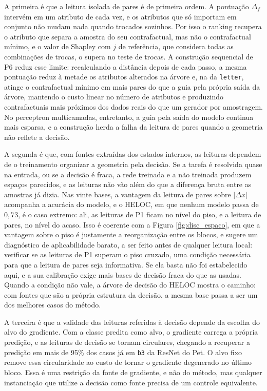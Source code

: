A primeira é que a leitura isolada de pares é de primeira ordem. A pontuação $\Delta_f$ intervém em um atributo de cada vez, e os atributos que só importam em conjunto não mudam nada quando trocados sozinhos. Por isso o ranking recupera o atributo que separa a amostra do seu contrafactual, mas não o contrafactual mínimo, e o valor de Shapley com $j$ de referência, que considera todas as combinações de trocas, o supera no teste de trocas. A construção sequencial de P6 reduz esse limite: recalculando a distância depois de cada passo, a mesma pontuação reduz à metade os atributos alterados na árvore e, na da \texttt{letter}, atinge o contrafactual mínimo em mais pares do que a guia pela própria saída da árvore, mantendo o custo linear no número de atributos e produzindo contrafactuais mais próximos dos dados reais do que um gerador por amostragem. No perceptron multicamadas, entretanto, a guia pela saída do modelo continua mais esparsa, e a construção herda a falha da leitura de pares quando a geometria não reflete a decisão.

A segunda é que, com fontes extraídas dos estados internos, as leituras dependem de o treinamento organizar a geometria pela decisão. Se a tarefa é resolvida quase na entrada, ou se a decisão é fraca, a rede treinada e a não treinada produzem espaços parecidos, e as leituras não vão além do que a diferença bruta entre as amostras já dizia. Nas vinte bases, a vantagem da leitura de pares sobre $|\Delta x|$ acompanha a acurácia do modelo, e o HELOC, em que nenhum modelo passa de $0{,}73$, é o caso extremo: ali, as leituras de P1 ficam no nível do piso, e a leitura de pares, no nível do acaso. Isso é coerente com a Figura \ref{fig:disc_espaco}, em que a vantagem sobre o piso é justamente a reorganização entre os blocos, e sugere um diagnóstico de aplicabilidade barato, a ser feito antes de qualquer leitura local: verificar se as leituras de P1 superam o piso cruzado, uma condição necessária para que a leitura de pares seja informativa. Se ela basta não foi estabelecido aqui, e a sua calibração exige mais bases de decisão fraca do que as usadas. Quando a condição não vale, a árvore de decisão do HELOC mostra o caminho: com fontes que são a própria estrutura da decisão, a mesma base passa a ser um dos melhores casos do método.

A terceira é que a validade das leituras referidas à decisão depende da escolha do alvo do gradiente. Com a classe predita como alvo, o gradiente carrega a própria predição, e as leituras de decisão se tornam circulares, chegando a recuperar a predição em mais de 95\% dos casos já em \texttt{b3} da ResNet do Pet. O alvo fixo remove essa circularidade ao custo de tornar o gradiente degenerado no último bloco. Essa é uma restrição da fonte de gradiente, e não do método, mas qualquer instanciação que utilize a decisão como fonte precisa de um controle equivalente.

